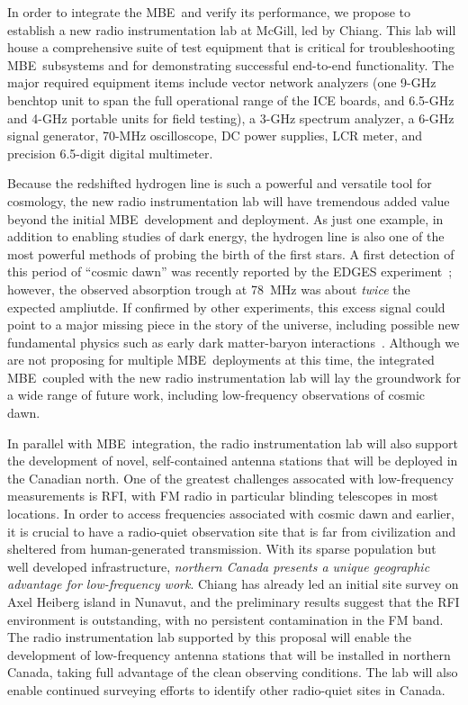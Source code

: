 \documentclass[letterpaper,11pt,preprint]{aastex}
\newcommand{\mbe}{{\rm MBE}}
\begin{document}
{\color{red} In order to integrate the \mbe\ and verify its
  performance, we propose to establish a new radio instrumentation lab
  at McGill, led by Chiang.  This lab will house a comprehensive suite
  of test equipment that is critical for troubleshooting
  \mbe\ subsystems and for demonstrating successful end-to-end
  functionality.  The major required equipment items include vector
  network analyzers (one 9-GHz benchtop unit to span the full
  operational range of the ICE boards, and 6.5-GHz and 4-GHz portable
  units for field testing), a 3-GHz spectrum analyzer, a 6-GHz signal
  generator, 70-MHz oscilloscope, DC power supplies, LCR meter, and
  precision 6.5-digit digital multimeter.

  Because the redshifted hydrogen line is such a powerful and
  versatile tool for cosmology, the new radio instrumentation lab will
  have tremendous added value beyond the initial \mbe\ development and
  deployment.  As just one example, in addition to enabling studies of
  dark energy, the hydrogen line is also one of the most powerful
  methods of probing the birth of the first stars.  A first detection
  of this period of ``cosmic dawn'' was recently reported by the EDGES
  experiment~\citep{Bowman2018}; however, the observed absorption
  trough at 78~MHz was about {\it twice} the expected ampliutde.  If
  confirmed by other experiments, this excess signal could point to a
  major missing piece in the story of the universe, including possible
  new fundamental physics such as early dark matter-baryon
  interactions~\citep{Barkana2018}.  Although we are not proposing for
  multiple \mbe\ deployments at this time, the integrated
  \mbe\ coupled with the new radio instrumentation lab will lay the
  groundwork for a wide range of future work, including low-frequency
  observations of cosmic dawn.

  In parallel with \mbe\ integration, the radio instrumentation lab
  will also support the development of novel, self-contained antenna
  stations that will be deployed in the Canadian north.  One of the
  greatest challenges assocated with low-frequency measurements is
  RFI, with FM radio in particular blinding telescopes in most
  locations.  In order to access frequencies associated with cosmic
  dawn and earlier, it is crucial to have a radio-quiet observation
  site that is far from civilization and sheltered from
  human-generated transmission.  With its sparse population but well
  developed infrastructure, {\it northern Canada presents a unique
    geographic advantage for low-frequency work}.  Chiang has already
  led an initial site survey on Axel Heiberg island in Nunavut, and
  the preliminary results suggest that the RFI environment is
  outstanding, with no persistent contamination in the FM band.  The
  radio instrumentation lab supported by this proposal will enable the
  development of low-frequency antenna stations that will be installed
  in northern Canada, taking full advantage of the clean observing
  conditions.  The lab will also enable continued surveying efforts to
  identify other radio-quiet sites in Canada.}
\end{document}
